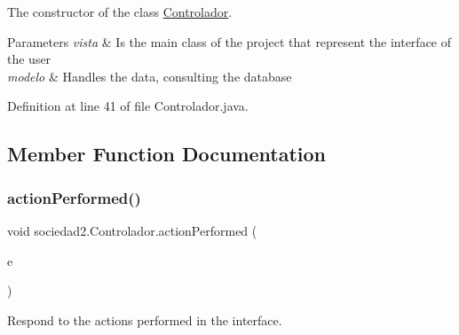The constructor of the class \mbox{\hyperlink{classsociedad2_1_1_controlador}{Controlador}}. 


\begin{DoxyParams}{Parameters}
{\em vista} & Is the \textquotesingle{}main\textquotesingle{} class of the project that represent the interface of the user \\
\hline
{\em modelo} & Handles the data, consulting the database \\
\hline
\end{DoxyParams}


Definition at line 41 of file Controlador.\+java.



\subsection{Member Function Documentation}
\mbox{\label{classsociedad2_1_1_controlador_a87860be9c7aff3e6d88d4e88f66e6f51}} 
\subsubsection{\texorpdfstring{action\+Performed()}{actionPerformed()}}
{\footnotesize\ttfamily void sociedad2.\+Controlador.\+action\+Performed (\begin{DoxyParamCaption}\item[{Action\+Event}]{e }\end{DoxyParamCaption})}



Respond to the actions performed in the interface. 


